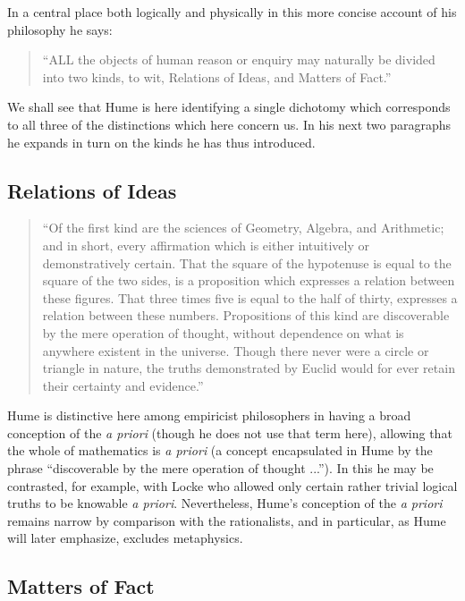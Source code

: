 In a central place both logically and physically in this more concise
account of his philosophy he says:

\begin{quote}
``ALL the objects of human reason or enquiry may naturally be divided
  into two kinds, to wit, Relations of Ideas, and Matters of Fact.'' 
\end{quote}

We shall see that Hume is here identifying a single dichotomy which
corresponds to all three of the distinctions which here concern us.
In his next two paragraphs he expands in turn on the kinds he has thus
introduced.

\subsection{Relations of Ideas}

\begin{quote}
``Of the first kind are the sciences of Geometry, Algebra, and
Arithmetic; and in short, every affirmation which is either
intuitively or demonstratively certain.
That the square of the hypotenuse is equal to the square of the two
sides, is a proposition which expresses a relation between these
figures.
That three times five is equal to the half of thirty, expresses a
relation between these numbers.
Propositions of this kind are discoverable by the mere operation of
thought, without dependence on what is anywhere existent in the
universe.
Though there never were a circle or triangle in nature, the truths
demonstrated by Euclid would for ever retain their certainty and
evidence.''
\end{quote}

Hume is distinctive here among empiricist philosophers in having a
broad conception of the {\it a priori} (though he does not use that
term here), allowing that the whole of mathematics is {\it a priori} (a concept encapsulated in Hume by the phrase ``discoverable by the mere operation of thought ...'').
In this he may be contrasted, for example, with Locke who allowed
only certain rather trivial logical truths to be knowable {\it a
  priori}.
Nevertheless, Hume's conception of the {\it a priori} remains narrow
by comparison with the rationalists, and in particular, as Hume will
later emphasize, excludes metaphysics.

\subsection{Matters of Fact}

